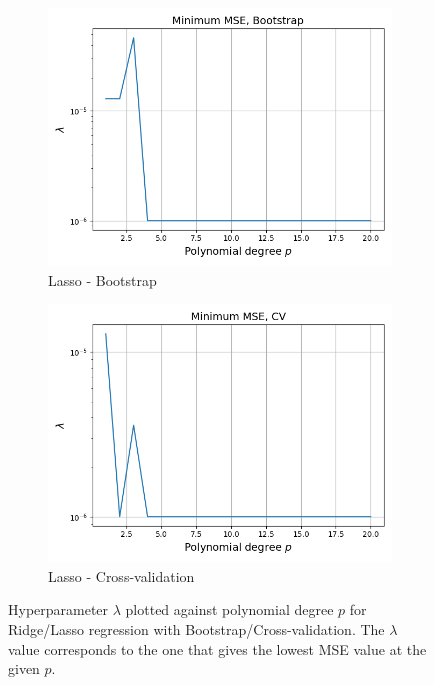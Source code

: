 \documentclass[a4paper]{article}
\begin{document}
\begin{figure}[H]
\begin{subfigure}{0.49\textwidth}
    \includegraphics[scale=0.45]{../figures/task_e/degree_lambda_N529_pmax20_nlamb10_noise0.05_seed4155_Lasso_boot_Nbs264.png}
    \caption{Lasso - Bootstrap}
  \end{subfigure}
  \begin{subfigure}{0.49\textwidth}
    \includegraphics[scale=0.45]{../figures/task_e/degree_lambda_N529_pmax20_nlamb10_noise0.05_seed4155_Lasso_cv_k5.png}
    \caption{Lasso - Cross-validation}
  \end{subfigure}
  \caption{Hyperparameter $\lambda$ plotted against polynomial degree $p$ for Ridge/Lasso regression with Bootstrap/Cross-validation. The $\lambda$ value corresponds to the one that gives the lowest MSE value at the given $p$.}
  \label{fig:franke_lambdap}
\end{figure}
\end{document}
